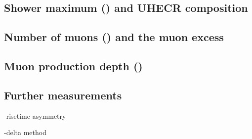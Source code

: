 \subsection{Shower maximum (\xmax) and UHECR composition}

\subsection{Number of muons (\nmu) and the muon excess}

\subsection{Muon production depth (\xmumax)}

\subsection{Further measurements}

-risetime asymmetry

-delta method





